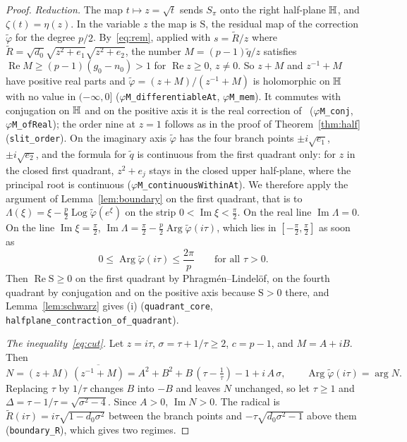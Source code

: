 \documentclass[10pt,a4paper]{article}
\theoremstyle{plain}
\theoremstyle{remark}
\numberwithin{equation}{section}
\DeclareMathOperator{\re}{Re}\DeclareMathOperator{\im}{Im}
\DeclareMathOperator{\Arg}{Arg}\DeclareMathOperator{\Log}{Log}
\newcommand{\lean}[1]{\texttt{#1}}
\begin{document}
\begin{proof}
\emph{Reduction.} The map $t\mapsto z=\sqrt t$ sends $S_\pi$ onto the right half-plane $\mathbb{H}$, and
$\zeta(t)=\eta(z)$. In the variable $z$ the map is $\mathrm S$, the residual map of the correction
$\tilde\varphi$ for the degree $p/2$. By~\eqref{eq:rem}, applied with $s=\tilde R/z$ where
$\tilde R=\sqrt{d_0}\sqrt{z^{2}+e_1}\sqrt{z^{2}+e_2}$, the number $M=(p-1)\tilde q/z$ satisfies
$\re M\ge(p-1)(g_0-n_0)>1$ for $\re z\ge0$, $z\ne0$. So $z+M$ and $z^{-1}+M$ have positive real
parts and $\tilde\varphi=(z+M)/(z^{-1}+M)$ is holomorphic on $\mathbb{H}$ with no value in $(-\infty,0]$
(\lean{$\varphi$M\_differentiableAt}, \lean{$\varphi$M\_mem}). It commutes with conjugation on $\mathbb{H}$
and on the positive axis it is the real correction of~\cite{v29} (\lean{$\varphi$M\_conj},
\lean{$\varphi$M\_ofReal}); the order nine at $z=1$ follows as in the proof of
Theorem~\ref{thm:half} (\lean{slit\_order}). On the imaginary axis $\tilde\varphi$ has the four
branch points $\pm i\sqrt{e_1}$, $\pm i\sqrt{e_2}$, and the formula for $\tilde q$ is continuous
from the first quadrant only: for $z$ in the closed first quadrant, $z^{2}+e_j$ stays in the closed
upper half-plane, where the principal root is continuous
(\lean{$\varphi$M\_continuousWithinAt}). We therefore apply the argument of
Lemma~\ref{lem:boundary} on the first quadrant, that is to
$\Lambda(\xi)=\xi-\frac p2\Log\tilde\varphi(e^{\xi})$ on the strip $0<\im\xi<\frac\pi2$. On the real
line $\im\Lambda=0$. On the line $\im\xi=\frac\pi2$,
$\im\Lambda=\frac\pi2-\frac p2\Arg\tilde\varphi(i\tau)$, which lies in $[-\frac\pi2,\frac\pi2]$ as
soon as
\begin{equation}\label{eq:cut}
 0\le\Arg\tilde\varphi(i\tau)\le\frac{2\pi}p\qquad\text{for all }\tau>0 .
\end{equation}
Then $\re\mathrm S\ge0$ on the first quadrant by Phragm\'en--Lindel\"of, on the fourth quadrant by
conjugation and on the positive axis because $\mathrm S>0$ there, and Lemma~\ref{lem:schwarz} gives
(i) (\lean{quadrant\_core}, \lean{halfplane\_contraction\_of\_quadrant}).

\emph{The inequality~\eqref{eq:cut}.} Let $z=i\tau$, $\sigma=\tau+1/\tau\ge2$, $c=p-1$, and
$M=A+iB$. Then
\[
 N=(z+M)\,\overline{(z^{-1}+M)}=A^{2}+B^{2}+B\,(\tau-\tfrac1\tau)-1+i\,A\,\sigma,\qquad
 \Arg\tilde\varphi(i\tau)=\arg N .
\]
Replacing $\tau$ by $1/\tau$ changes $B$ into $-B$ and leaves $N$ unchanged, so let $\tau\ge1$ and
$\Delta=\tau-1/\tau=\sqrt{\sigma^{2}-4}$. Since $A>0$, $\im N>0$. The radical is
$\tilde R(i\tau)=i\tau\sqrt{1-d_0\sigma^{2}}$ between the branch points and
$-\tau\sqrt{d_0\sigma^{2}-1}$ above them (\lean{boundary\_R}), which gives two regimes.


\end{proof}
\end{document}
